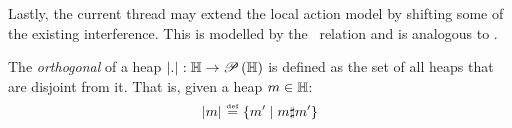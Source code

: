Lastly, the current thread may extend the local action model by shifting some of the existing interference. This is modelled by the \shiftG\ relation and is analogous to \shiftR.
%
%
\begin{definition}[Orthogonal]\label{def:orthogonal}
The \emph{orthogonal} of a heap  $\left\lvert .\right\rvert_{}: \mathbb{H} \rightarrow \mathscr{P}\left(\mathbb{H} \right)$ is defined as the set of all heaps that are disjoint from it. That is, given a heap $m \in \mathbb{H}$:
%
\[
	\left\lvert m\right\rvert_{} \mathrel{\stackrel{\smash{\scriptscriptstyle{\mathrm{def}}}}{=}} \left\{ m' \mid m \sharp m' \right\}
\]
%
\end{definition}
%
%	




